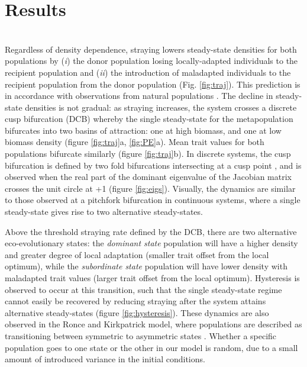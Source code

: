 \documentclass{revtex4}
\begin{document}
\section{Results}


 \\
\noindent Regardless of density dependence, straying lowers steady-state densities for both populations by (\emph{i}) the donor population losing locally-adapted individuals to the recipient population and (\emph{ii}) the introduction of maladapted individuals to the recipient population from the donor population (Fig. \ref{fig:traj}).
This prediction is in accordance with observations from natural populations \citep{Bett:2017ha}. %
The decline in steady-state densities is not gradual: as straying increases, the system crosses a discrete cusp bifurcation (DCB) \citep{AleksandrovichKuznetsov:1995p2580} whereby the single steady-state for the metapopulation bifurcates into two basins of attraction: one at high biomass, and one at low biomass density (figure \ref{fig:traj}a, \ref{fig:PE}a).
Mean trait values for both populations bifurcate similarly (figure \ref{fig:traj}b). 
In discrete systems, the cusp bifurcation is defined by two fold bifurcations intersecting at a cusp point \citep{AleksandrovichKuznetsov:1995p2580}, and is observed when the real part of the dominant eigenvalue of the Jacobian matrix crosses the unit circle at +1 (figure \ref{fig:eigs}).
Visually, the dynamics are similar to those observed at a pitchfork bifurcation in continuous systems, where a single steady-state gives rise to two alternative steady-states.


Above the threshold straying rate defined by the DCB, there are two alternative eco-evolutionary states: the \emph{dominant state} population will have a higher density and greater degree of local adaptation (smaller trait offset from the local optimum), while the \emph{subordinate state} population will have lower density with maladapted trait values (larger trait offset from the local optimum). 
Hysteresis is observed to occur at this transition, such that the single steady-state regime cannot easily be recovered by reducing straying after the system attains alternative steady-states (figure \ref{fig:hysteresis}).
These dynamics are also observed in the Ronce and Kirkpatrick model, where populations are described as transitioning between symmetric to asymmetric states \citep{Ronce:2001dp}.
Whether a specific population goes to one state or the other in our model is random, due to a small amount of introduced variance in the initial conditions.
\end{document}
